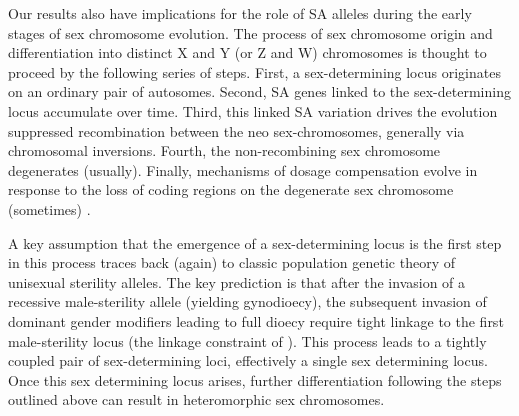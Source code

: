 \documentclass[9pt,twocolumn,twoside,lineno]{gsajnl}
\begin{document}
Our results also have implications for the role of SA alleles during the early stages of sex chromosome evolution. The process of sex chromosome origin and differentiation into distinct X and Y (or Z and W) chromosomes is thought to proceed by the following series of steps. First, a sex-determining locus originates on an ordinary pair of autosomes. Second, SA genes linked to the sex-determining locus accumulate over time. Third, this linked SA variation drives the evolution suppressed recombination between the neo sex-chromosomes, generally via chromosomal inversions. Fourth, the non-recombining sex chromosome degenerates (usually). Finally, mechanisms of dosage compensation evolve in response to the loss of coding regions on the degenerate sex chromosome (sometimes) \citep{Rice1987,Charlesworth2002,Bachtrog2006,Qiuetal2013,Bachtrog2014}. 

A key assumption that the emergence of a sex-determining locus is the first step in this process traces back (again) to classic population genetic theory of unisexual sterility alleles. The key prediction is that after the invasion of a recessive male-sterility allele (yielding gynodioecy), the subsequent invasion of dominant gender modifiers leading to full dioecy require tight linkage to the first male-sterility locus (the linkage constraint of \citealt{Charlesworth1978a}). This process leads to a tightly coupled pair of sex-determining loci, effectively a single sex determining locus. Once this sex determining locus arises, further differentiation following the steps outlined above can result in heteromorphic sex chromosomes.
\end{document}
